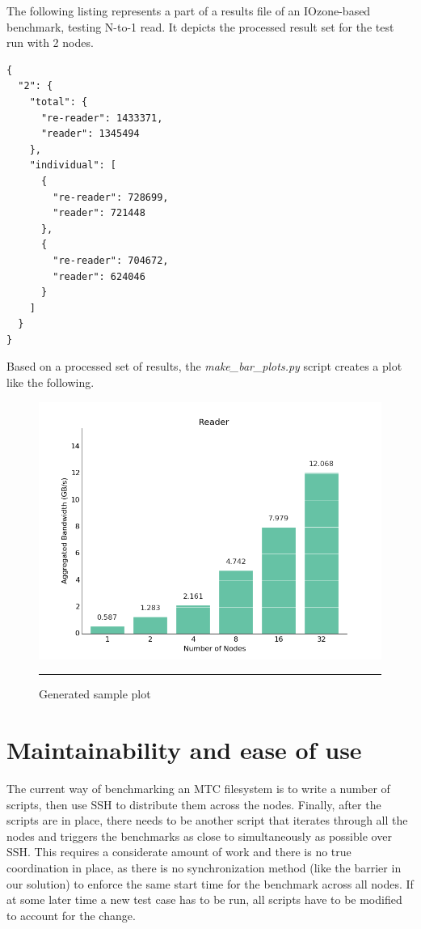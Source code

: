 The following listing represents a part of a results file of an IOzone-based benchmark, testing N-to-1 read. It depicts the processed result set for the test run with 2 nodes.

\begin{verbatim}
{
  "2": {
    "total": {
      "re-reader": 1433371, 
      "reader": 1345494
    }, 
    "individual": [
      {
        "re-reader": 728699, 
        "reader": 721448
      }, 
      {
        "re-reader": 704672, 
        "reader": 624046
      }
    ]
  }
}
\end{verbatim}

Based on a processed set of results, the \textit{make\_bar\_plots.py} script creates a plot like the following.

\begin{figure}[H]
  \centering
    \includegraphics[scale=0.5]{Figures/reader.png}
    \rule{25em}{0.5pt}
  \caption[Generated sample plot]{Generated sample plot}
  \label{fig:plot}
\end{figure}

\section{Maintainability and ease of use}

The current way of benchmarking an MTC filesystem is to write a number of scripts, then use SSH to distribute them across the nodes. Finally, after the scripts are in place, there needs to be another
script that iterates through all the nodes and triggers the benchmarks as close to simultaneously as possible over SSH. This requires a considerate amount of work and there is no true coordination in place, as there is no synchronization method (like the barrier in our solution) to enforce the same start time for the benchmark across all nodes. If at some later time a new test case has to be run, all scripts have to be modified to account for the change.

